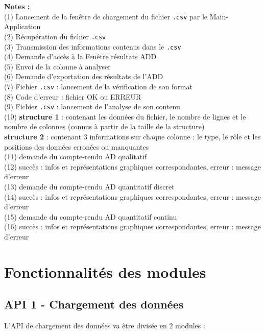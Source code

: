 		\hspace{-\parindent}\textbf{Notes :}\\
			(1) Lancement de la fenêtre de chargement du fichier \lstinline!.csv! par le Main-Application\\
			(2) Récupération du fichier \lstinline!.csv! \\
			(3) Transmission des informations contenus dans le \lstinline!.csv!\\
			(4) Demande d'accès à la Fenêtre résultats ADD\\
			(5) Envoi de la colonne à analyser\\
			(6) Demande d'exportation des résultats de l'ADD\\
			(7) Fichier \lstinline!.csv! : lancement de la vérification de son format\\
			(8) Code d'erreur : fichier OK ou ERREUR\\
			(9) Fichier \lstinline!.csv! : lancement de l'analyse de son contenu\\
			(10) \textbf{structure 1} : contenant les données du fichier, le nombre de lignes et le nombre de colonnes (connus à partir de la taille de la structure)\\
			\hspace*{1.9em} \textbf{structure 2} : contenant 3 informations sur chaque colonne : le type, le rôle et les positions des données erronées ou manquantes\\
			(11) demande du compte-rendu AD qualitatif\\
			(12) succès : infos et représentations graphiques correspondantes, erreur : message d'erreur\\
			(13) demande du compte-rendu AD quantitatif discret\\
			(14) succès : infos et représentations graphiques correspondantes, erreur : message d'erreur\\
			(15) demande du compte-rendu AD quantitatif continu\\
			(16) succès : infos et représentations graphiques correspondantes, erreur : message d'erreur\\
	
	\section{Fonctionnalités des modules}
		\subsection{API 1 - Chargement des données}
			L'API de chargement des données va être divisée en 2 modules :
			
